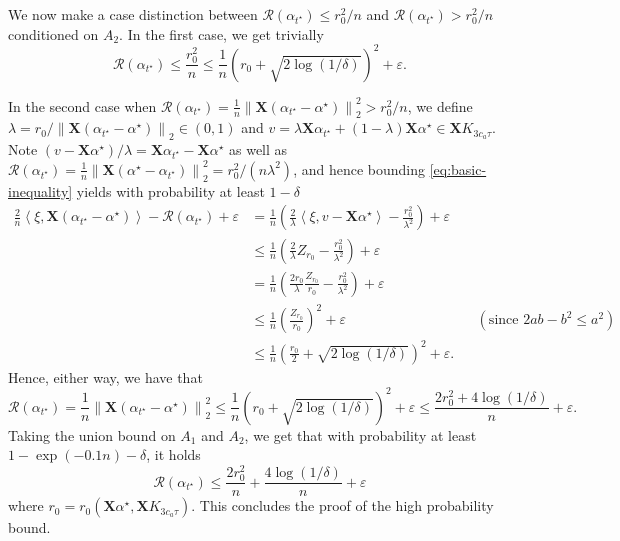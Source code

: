 \documentclass[a4paper]{article}
\newcommand{\pr}[1]{\left(#1\right)}
\newcommand{\norm}[1]{\left\|#1\right\|}
\newcommand{\inner}[2]{\left\langle #1,#2\right\rangle}
\newcommand{\X}[0]{\mathbf{X}}
\newcommand{\cR}[0]{\mathcal{R}}
\newcommand{\eps}[0]{\varepsilon}
\newcommand{\alphastar}{\alpha^\star}
\newcommand{\alphatstar}[0]{\alpha_{t^\star}}
\newcommand{\rzero}[0]{r_{0}}
\theoremstyle{thmstyle}
\theoremstyle{defstyle}
\theoremstyle{remark}
\begin{document}
We now make a case distinction between $\cR(\alphatstar)\leq \rzero^2/n$ and $\cR(\alphatstar)> \rzero^2/n$ conditioned on $A_2$.
In the first case, we get trivially 
\begin{equation*}
    \cR(\alphatstar)\leq \frac{\rzero^2}{n} \leq \frac{1}{n}\pr{\rzero+\sqrt{2\log(1/\delta)}}^2+\eps.
\end{equation*}

In the second case when $ \cR(\alphatstar)=\frac{1}{n}\norm{\X(\alphatstar-\alphastar)}_2^2> \rzero^2/n$, we define $\lambda = \rzero/\norm{\X(\alphatstar-\alphastar)}_2\in(0,1)$ and $v=\lambda \X\alphatstar+(1-\lambda)\X\alphastar \in \X K_{3c_a\tau}$. Note $(v-\X\alphastar)/\lambda = \X\alphatstar-\X\alphastar$ as well as $\cR(\alphatstar)=\frac{1}{n}\norm{\X(\alphastar-\alphatstar)}_2^2=\rzero^2/(n\lambda^2)$, and hence bounding \cref{eq:basic-inequality} yields with probability at least $1-\delta$
\begin{align*}
    \frac{2}{n}\inner{\xi}{\X(\alphatstar-\alphastar)}-\cR(\alphatstar)+\eps&=\frac{1}{n}\pr{\frac{2}{\lambda }\inner{\xi}{v-\X\alphastar}-\frac{\rzero^2}{\lambda^2}} +\eps\\
    &\leq \frac{1}{n}\pr{\frac{2}{\lambda}Z_{\rzero}-\frac{\rzero^2}{\lambda^2}}+\eps\\
    &=\frac{1}{n}\pr{\frac{2\rzero}{\lambda}\frac{Z_{\rzero}}{\rzero}-\frac{\rzero^2}{\lambda^2}}+\eps\\
    &\leq \frac{1}{n}\pr{\frac{Z_{\rzero}}{\rzero}}^2+\eps &&(\text{since }2ab-b^2\leq a^2)\\
    &\leq \frac{1}{n}\pr{\frac{\rzero}{2}+\sqrt{2\log(1/\delta)}}^2+\eps.
\end{align*}
Hence, either way, we have that
\begin{equation*}
    \cR(\alphatstar)=\frac{1}{n}\norm{\X(\alphatstar-\alphastar)}_2^2\leq \frac{1}{n}\pr{\rzero+\sqrt{2\log(1/\delta)}}^2+\eps \leq \frac{2\rzero^2+4\log(1/\delta)}{n}+\eps. 
\end{equation*}
Taking the union bound on $A_1$ and $A_2$, we get that with probability at least $1-\exp\pr{-0.1n}-\delta$, it holds
\begin{equation*}
    \cR(\alphatstar)\leq \frac{2\rzero^2}{n}+\frac{4\log(1/\delta)}{n} + \eps
\end{equation*}
where $\rzero = \rzero(\X\alphastar,\X K_{3c_a\tau})$. This concludes the proof of the high probability bound.
\end{document}
